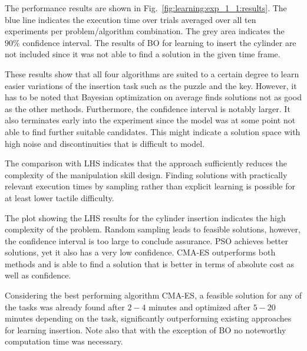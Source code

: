 The performance results are shown in Fig.~\ref{fig:learning:exp_1_1:results}.
The blue line indicates the execution time over trials averaged over all ten experiments per problem/algorithm combination.
The grey area indicates the $90 \%$ confidence interval.
The results of BO for learning to insert the cylinder are not included since it was not able to find a solution in the given time frame.

These results show that all four algorithms are suited to a certain degree to learn easier variations of the insertion task such as the puzzle and the key.
However, it has to be noted that Bayesian optimization on average finds solutions not as good as the other methods.
Furthermore, the confidence interval is notably larger.
It also terminates early into the experiment since the model was at some point not able to find further suitable candidates.
This might indicate a solution space with high noise and discontinuities that is difficult to model.

The comparison with LHS indicates that the \skillmodelabbr{} approach sufficiently reduces the complexity of the manipulation skill design.
Finding solutions with practically relevant execution times by sampling rather than explicit learning is possible for at least lower tactile difficulty.

The plot showing the LHS results for the cylinder insertion indicates the high complexity of the problem.
Random sampling leads to feasible solutions, however, the confidence interval is too large to conclude assurance.
PSO achieves better solutions, yet it also has a very low confidence.
CMA-ES outperforms both methods and is able to find a solution that is better in terms of absolute cost as well as confidence.

Considering the best performing algorithm CMA-ES, a feasible solution for any of the tasks was already found after $2-4$ minutes and optimized after $5-20$ minutes depending on the task, significantly outperforming existing approaches for learning insertion.
Note also that with the exception of BO no noteworthy computation time was necessary.